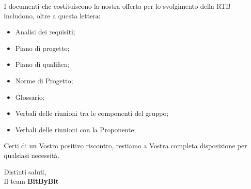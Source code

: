 \documentclass[a4paper,12pt]{article}
\begin{document}
\begin{flushleft}
I documenti che costituiscono la nostra offerta per lo svolgimento della RTB includono, oltre a questa lettera:
\begin{itemize}
    \item Analisi dei requisiti;
    \item Piano di progetto;
    \item Piano di qualifica;
    \item Norme di Progetto;
    \item Glossario;
    \item Verbali delle riunioni tra le componenti del gruppo;
    \item Verbali delle riunioni con la Proponente;
\end{itemize}

Certi di un Vostro positivo riscontro, restiamo a Vostra completa disposizione per qualsiasi necessità.

\vspace{0.8cm}
Distinti saluti,\\
\vspace{0.2cm}
Il team \textbf{BitByBit}
\end{flushleft}
\end{document}
